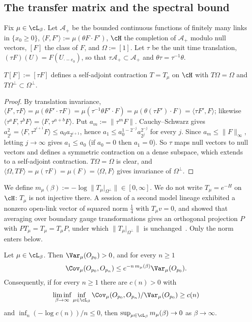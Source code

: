 \subsection{The transfer matrix and the spectral bound}\label{pf:sec-transfer}

Fix $\mu\in\cL_\beta$. Let $\mathcal A_+$ be the bounded continuous functions of finitely many links in $\{x_0\ge0\}$, $\langle F,F'\rangle:=\mu(\theta F\cdot F')$, $\cH$ the completion of $\mathcal A_+$ modulo null vectors, $[F]$ the class of $F$, and $\Omega:=[1]$. Let $\tau$ be the unit time translation, $(\tau F)(U)=F(U_{\cdot-e_0})$, so that $\tau\mathcal A_+\subset\mathcal A_+$ and $\theta\tau=\tau^{-1}\theta$.

\begin{lemma}\label{pf:lem-transfer}
$T[F]:=[\tau F]$ defines a self-adjoint contraction $T=T_\mu$ on $\cH$ with $T\Omega=\Omega$ and $T\Omega^\perp\subset\Omega^\perp$.
\end{lemma}

\begin{proof}
By translation invariance, $\langle F',\tau F\rangle=\mu(\theta F'\cdot\tau F)=\mu(\tau^{-1}\theta F'\cdot F)=\mu(\theta(\tau F')\cdot F)=\langle\tau F',F\rangle$; likewise $\langle\tau^aF,\tau^bF\rangle=\langle F,\tau^{a+b}F\rangle$. Put $a_m:=\|\tau^mF\|$. Cauchy--Schwarz gives $a_{2^i}^2=\langle F,\tau^{2^{i+1}}F\rangle\le a_0a_{2^{i+1}}$, hence $a_1\le a_0^{1-2^{-j}}a_{2^j}^{2^{-j}}$ for every $j$. Since $a_m\le\|F\|_\infty$, letting $j\to\infty$ gives $a_1\le a_0$ (if $a_0=0$ then $a_1=0$). So $\tau$ maps null vectors to null vectors and defines a symmetric contraction on a dense subspace, which extends to a self-adjoint contraction. $T\Omega=\Omega$ is clear, and $\langle\Omega,TF\rangle=\mu(\tau F)=\mu(F)=\langle\Omega,F\rangle$ gives invariance of $\Omega^\perp$.
\end{proof}

We define $m_\mu(\beta):=-\log\|T_\mu|_{\Omega^\perp}\|\in[0,\infty]$. We do not write $T_\mu=e^{-H}$ on $\cH$: $T_\mu$ is not injective there. A session of a second model lineage exhibited a nonzero open-link vector of squared norm $\tfrac14$ with $T_\mu v=0$, and showed that averaging over boundary gauge transformations gives an orthogonal projection $P$ with $PT_\mu=T_\mu=T_\mu P$, under which $\|T_\mu|_{\Omega^\perp}\|$ is unchanged~\cite[comments 7105447358, 7104999220]{RepoThread}. Only the norm enters below.

\begin{proposition}\label{pf:prop-spectral}
Let $\mu\in\cL_\beta$. Then $\Var_\mu(O_{p_0})>0$, and for every $n\ge1$
\begin{equation}\label{pf:eq-S1}
\Cov_\mu(O_{p_0},O_{p_n})\le e^{-n\,m_\mu(\beta)}\Var_\mu(O_{p_0}).
\end{equation}
Consequently, if for every $n\ge1$ there are $c(n)>0$ with
\[\liminf_{\beta\to\infty}\inf_{\mu\in\cL_\beta}\Cov_\mu(O_{p_0},O_{p_n})/\Var_\mu(O_{p_0})\ge c(n)\]
and $\inf_n(-\log c(n))/n\le0$, then $\sup_{\mu\in\cL_\beta}m_\mu(\beta)\to0$ as $\beta\to\infty$.
\end{proposition}

